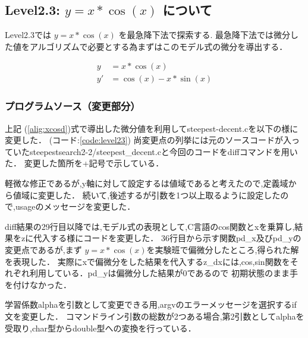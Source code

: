 \subsection{Level2.3: $y=x*\cos(x)$ について}
Level2.3では $y=x*\cos(x)$ を最急降下法で探索する.
最急降下法では微分した値をアルゴリズムで必要とする為まずはこのモデル式の微分を導出する．

\begin{align}
    y &= x * \cos(x) \label{alig:cos}\\
    y' &= \cos(x) - x * \sin(x)
    \label{alig:xcosd}
\end{align}


\subsubsection{プログラムソース（変更部分）}

上記 (\ref{alig:xcosd})式で導出した微分値を利用してsteepest-decent.cを以下の様に変更した． (コード:\ref{code:level23})
尚変更点の列挙には元のソースコードが入っていたsteepestsearch2-2/steepest\_decent.cと今回のコードをdiffコマンドを用いた．
変更した箇所を+記号で示している．


軽微な修正であるが,y軸に対して設定するは値域であると考えたので,定義域から値域に変更した．
続いて,後述するが引数を1つ以上取るように設定したので,usageのメッセージを変更した．

diff結果の29行目以降では,モデル式の表現として,C言語のcos関数とxを乗算し,結果をzに代入する様にコードを変更した．
36行目から示す関数pd\_x及びpd\_yの変更点であるが,まず $y=x* \cos(x)$を実験班で偏微分したところ,得られた解を表現した．
実際にxで偏微分をした結果を代入するz\_dxには,cos,sin関数をそれぞれ利用している．pd\_yは偏微分した結果が0であるので
初期状態のまま手を付けなかった．


学習係数alphaを引数として変更できる用,argvのエラーメッセージを選択するif文を変更した．
コマンドライン引数の総数が2つある場合,第2引数としてalphaを受取り,char型からdouble型への変換を行っている．

